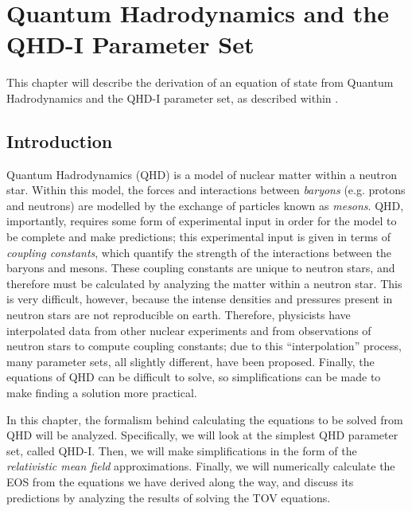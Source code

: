 \chapter{Quantum Hadrodynamics and the QHD-I Parameter Set}

This chapter will describe the derivation of an equation of state from Quantum Hadrodynamics and the QHD-I parameter set, as described within \autocite{diener_2008}.

\section{Introduction}

Quantum Hadrodynamics (QHD) is a model of nuclear matter within a neutron star. Within this model, the forces and interactions between \textit{baryons} (e.g. protons and neutrons) are modelled by the exchange of particles known as \textit{mesons}. QHD, importantly, requires some form of experimental input in order for the model to be complete and make predictions; this experimental input is given in terms of \textit{coupling constants}, which quantify the strength of the interactions between the baryons and mesons. These coupling constants are unique to neutron stars, and therefore must be calculated by analyzing the matter within a neutron star. This is very difficult, however, because the intense densities and pressures present in neutron stars are not reproducible on earth. Therefore, physicists have interpolated data from other nuclear experiments and from observations of neutron stars to compute coupling constants; due to this ``interpolation'' process, many parameter sets, all slightly different, have been proposed. Finally, the equations of QHD can be difficult to solve, so simplifications can be made to make finding a solution more practical.

In this chapter, the formalism behind calculating the equations to be solved from QHD will be analyzed. Specifically, we will look at the simplest QHD parameter set, called QHD-I. Then, we will make simplifications in the form of the \textit{relativistic mean field} approximations. Finally, we will numerically calculate the EOS from the equations we have derived along the way, and discuss its predictions by analyzing the results of solving the TOV equations.


